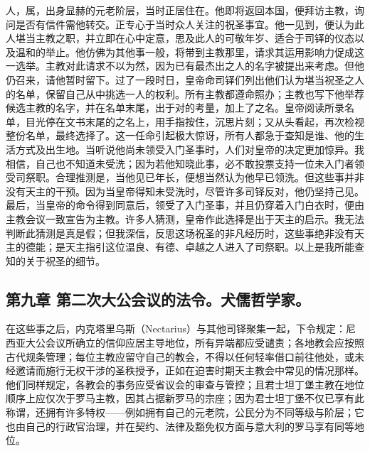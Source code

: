 人，属，出身显赫的元老阶层，当时正居住在。他即将返回本国，便拜访主教，询问是否有信件需他转交。正专心于当时众人关注的祝圣事宜。他一见到，便认为此人堪当主教之职，并立即在心中定意，思及此人的可敬年岁、适合于司铎的仪态以及温和的举止。他仿佛为其他事一般，将带到主教那里，请求其运用影响力促成这一选举。主教对此请求不以为然，因为已有最杰出之人的名字被提出来考虑。但他仍召来，请他暂时留下。过了一段时日，皇帝命司铎们列出他们认为堪当祝圣之人的名单，保留自己从中挑选一人的权利。所有主教都遵命照办；主教也写下他举荐候选主教的名字，并在名单末尾，出于对的考量，加上了之名。皇帝阅读所录名单，目光停在文书末尾的之名上，用手指按住，沉思片刻；又从头看起，再次检视整份名单，最终选择了。这一任命引起极大惊讶，所有人都急于查知是谁、他的生活方式及出生地。当听说他尚未领受入门圣事时，人们对皇帝的决定更加惊异。我相信，自己也不知道未受洗；因为若他知晓此事，必不敢投票支持一位未入门者领受司祭职。合理推测是，当他见已年长，便想当然认为他早已领洗。但这些事并非没有天主的干预。因为当皇帝得知未受洗时，尽管许多司铎反对，他仍坚持己见。最后，当皇帝的命令得到同意后，领受了入门圣事，并且仍穿着入门白衣时，便由主教会议一致宣告为主教。许多人猜测，皇帝作此选择是出于天主的启示。我无法判断此猜测是真是假；但我深信，反思这场祝圣的非凡经历时，这些事绝非没有天主的德能；是天主指引这位温良、有德、卓越之人进入了司祭职。以上是我所能查知的关于祝圣的细节。\par


\subsection{第九章 第二次大公会议的法令。犬儒哲学家。}

在这些事之后，内克塔里乌斯（Nectarius）与其他司铎聚集一起，下令规定：尼西亚大公会议所确立的信仰应居主导地位，所有异端都应受谴责；各地教会应按照古代规条管理；每位主教应留守自己的教会，不得以任何轻率借口前往他处，或未经邀请而施行无权干涉的圣秩授予，正如在迫害时期天主教会中常见的情况那样。他们同样规定，各教会的事务应受省议会的审查与管控；且君士坦丁堡主教在地位顺序上应仅次于罗马主教，因其占据新罗马的宗座；因为君士坦丁堡不仅已享有此称谓，还拥有许多特权——例如拥有自己的元老院，公民分为不同等级与阶层；它也由自己的行政官治理，并在契约、法律及豁免权方面与意大利的罗马享有同等地位。\par

